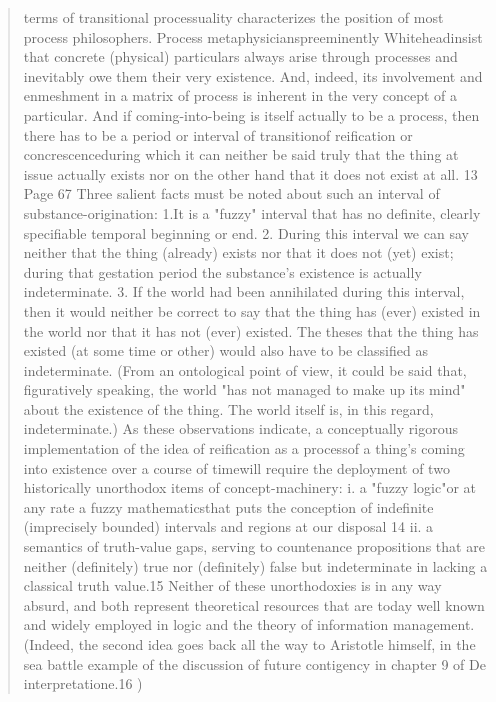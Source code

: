 \documentclass[a4paper]{Thesis}
\begin{document}
\begin{quotation}
	terms of transitional processuality characterizes the position of most process
	philosophers. Process metaphysicianspreeminently Whiteheadinsist that concrete
	(physical) particulars always arise through processes and inevitably owe them their very
	existence. And, indeed, its involvement and enmeshment in a matrix of process is
	inherent in the very concept of a particular.
	And if coming-into-being is itself actually to be a process, then there has to be a period or
	interval of transitionof reification or concrescenceduring which it can neither be said truly
	that the thing at issue actually exists nor on the other hand that it does not exist at all. 13
	Page 67
	Three salient facts must be noted about such an interval of substance-origination:
	1.It is a "fuzzy" interval that has no definite, clearly specifiable temporal
	beginning or end.
	2.
	During this interval we can say neither that the thing (already) exists
	nor that it does not (yet) exist; during that gestation period the
	substance's existence is actually indeterminate.
	3.
	If the world had been annihilated during this interval, then it would
	neither be correct to say that the thing has (ever) existed in the world
	nor that it has not (ever) existed. The theses that the thing has existed
	(at some time or other) would also have to be classified as
	indeterminate. (From an ontological point of view, it could be said that,
	figuratively speaking, the world "has not managed to make up its mind"
	about the existence of the thing. The world itself is, in this regard,
	indeterminate.)
	As these observations indicate, a conceptually rigorous implementation of the idea of
	reification as a processof a thing's coming into existence over a course of timewill require
	the deployment of two historically unorthodox items of concept-machinery:
	i.
	a "fuzzy logic"or at any rate a fuzzy mathematicsthat puts the
	conception of indefinite (imprecisely bounded) intervals and regions at
	our disposal 14
	ii.
	a semantics of truth-value gaps, serving to countenance propositions
	that are neither (definitely) true nor (definitely) false but indeterminate
	in lacking a classical truth value.15
	Neither of these unorthodoxies is in any way absurd, and both represent theoretical
	resources that are today well known and widely employed in logic and the theory of
	information management. (Indeed, the second idea goes back all the way to Aristotle
	himself, in the sea battle example of the discussion of future contigency in chapter 9 of
	De interpretatione.16 )
	
\end{quotation}
\end{document}
